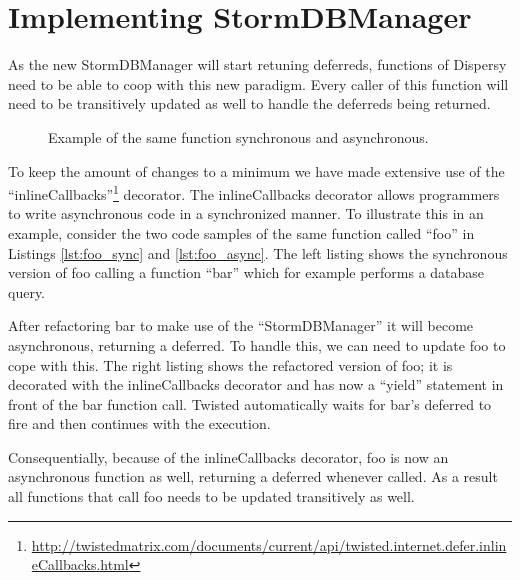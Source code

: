 \section{Implementing StormDBManager}
\label{sct:implementing_stormdbmanager}

As the new StormDBManager will start retuning deferreds, functions of Dispersy need to be able to coop with this new paradigm.
Every caller of this function will need to be transitively updated as well to handle the deferreds being returned.

\begin{figure}[h]
	\begin{subfigure}[b]{.5\linewidth}
		
	\end{subfigure}
	\begin{subfigure}[b]{.5\linewidth}
		
	\end{subfigure}
	\caption*{Example of the same function synchronous and asynchronous.}
\end{figure}

To keep the amount of changes to a minimum we have made extensive use of the \enquote{inlineCallbacks}\footnote{\url{http://twistedmatrix.com/documents/current/api/twisted.internet.defer.inlineCallbacks.html}} decorator.
The inlineCallbacks decorator allows programmers to write asynchronous code in a synchronized manner.
To illustrate this in an example, consider the two code samples of the same function called \enquote{foo} in Listings \ref{lst:foo_sync} and \ref{lst:foo_async}.
The left listing shows the synchronous version of foo calling a function \enquote{bar} which for example performs a database query.

After refactoring bar to make use of the \enquote{StormDBManager} it will become asynchronous, returning a deferred.
To handle this, we can need to update foo to cope with this.
The right listing shows the refactored version of foo; it is decorated with the inlineCallbacks decorator and has now a \enquote{yield} statement in front of the bar function call.
Twisted automatically waits for bar's deferred to fire and then continues with the execution.

Consequentially, because of the inlineCallbacks decorator, foo is now an asynchronous function as well, returning a deferred whenever called.
As a result all functions that call foo needs to be updated transitively as well.

